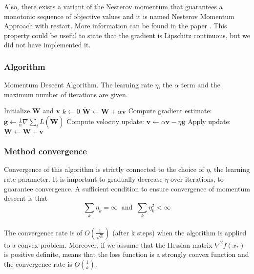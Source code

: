 Also, there exists a variant of the Nesterov momentum that guarantees a monotonic sequence of objective values and it is named Nesterov Momentum Approach with restart. More information can be found in the paper \cite{NWR}. This property could be useful to state that the gradient is Lipschitz continuous, but we did not have implemented it.


\subsubsection{Algorithm}
\begin{algorithm}[H]
	\caption{Momentum Descent Algorithm. The learning rate $\eta$, the $\alpha$ term and the maximum number of iterations are given.}
	\label{alg:sgd}
	\begin{algorithmic}[1]
		\State Initialize \textbf{W} and \textbf{v}
		\State $k \gets 0$
		\State $\tilde{\textbf{W}} \gets \textbf{W} + \alpha \textbf{v}$
		\EndIf
		\State Compute gradient estimate: $\textbf{g} \gets \frac {1}{n} \nabla \sum_i\textit{L}(\tilde{\textbf{W}})$
		\State Compute velocity update: $\textbf{v} \gets \alpha \textbf{v} - \eta \textbf{g}$
		\State Apply update: $\textbf{W} \gets \textbf{W} + \textbf{v}$
		\EndWhile
		\EndProcedure
	\end{algorithmic}
\end{algorithm}

\subsubsection{Method convergence}
\label{MDA-convergence}
Convergence of this algorithm is strictly connected to the choice of $\eta$, the learning rate parameter. It is important to gradually decrease $\eta$ over iterations, to guarantee convergence. A sufficient condition to ensure convergence of momentum descent is that 
\begin{equation}
\label{assumption:momentum_descent}
\sum_k \eta_k=\infty \  \text{ and } \ \sum_k \eta_k^2 < \infty
\end{equation}
\\
The convergence rate is of $O(\frac{1}{\sqrt{k}})$ (after k steps) when the algorithm is applied to a convex problem. 
Moreover, if we assume that the Hessian matrix $\nabla^2f(x_*)$ is positive definite, means that the loss function is a strongly convex function and the convergence rate is $O(\frac{1}{k})$. \cite{goodfellow}

